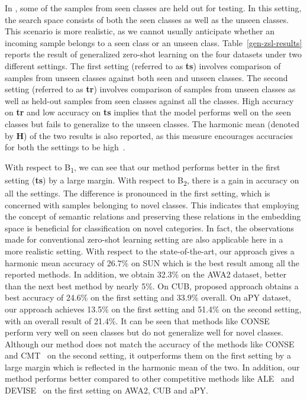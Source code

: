 \documentclass[10pt,twocolumn,letterpaper]{article}
\begin{document}
In \cite{Xian_2017_CVPR}, some of the samples from seen classes are held out for testing. In this setting, the search space consists of both the seen classes as well as the unseen classes. This scenario is more realistic, as we cannot usually anticipate whether an incoming sample belongs to a seen class or an unseen class. Table~\ref{gen-zsl-results} reports the result of generalized zero-shot learning on the four datasets under two different settings. 
The first setting (referred to as \textbf{ts}) involves comparison of samples from unseen classes against both seen and unseen classes. %
The second setting (referred to as \textbf{tr}) involves comparison of samples from unseen classes as well as held-out samples from seen classes against all the classes. High accuracy on \textbf{tr} and low accuracy on \textbf{ts} implies that the model performs well on the seen classes but fails to generalize to the unseen classes. 
The harmonic mean (denoted by \textbf{H}) of the two results is also reported, as this measure encourages accuracies for both the settings to be high~\cite{Xian_2017_CVPR,xian2017zero1}.

With respect to B\textsubscript{1}, we can see that our method performs better in the first setting (\textbf{ts}) by a large margin. With respect to B\textsubscript{2}, there is a gain in accuracy on all the settings. The difference is pronounced in the first setting, which is concerned with samples belonging to novel classes. This indicates that employing the concept of semantic relations and preserving these relations in the embedding space is beneficial for classification on novel categories. In fact, the observations made for conventional zero-shot learning setting are also applicable here in a more realistic setting. With respect to the state-of-the-art, our approach gives a harmonic mean accuracy of 26.7\%  on SUN which is the best result among all the reported methods. %
In addition, we obtain 32.3\% on the AWA2 dataset, better than the next best method by nearly 5\%. On CUB, proposed approach obtains a best accuracy of 24.6\% on the first setting and 33.9\% overall. On aPY dataset, our approach achieves 13.5\% on the first setting and 51.4\% on the second setting, with an overall result of 21.4\%. It can be seen that methods like CONSE~\cite{norouzi2013zero} perform very well on seen classes but do not generalize well for novel classes. Although our method does not match the accuracy of the methods like CONSE~\cite{norouzi2013zero} and CMT~\cite{socher2013zero} on the second setting, it outperforms them on the first setting by a large margin which is reflected in the harmonic mean of the two. In addition, our method performs better compared to other competitive methods like ALE~\cite{akata2016label} and DEVISE~\cite{frome2013devise} on the first setting on AWA2, CUB and aPY. %
\end{document}
